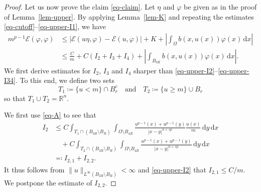 \documentclass[11pt]{amsart}
\theoremstyle{plain}
\theoremstyle{definition}
\numberwithin{equation}{section}
\begin{document}
\begin{proof}
Let us now prove the claim \eqref{eq-claim}. Let $\eta$ and $\varphi$ be given as in the proof of Lemma~\ref{lem-upper}. By applying Lemma~\ref{lem-K} and repeating the estimates \eqref{eq-cutoff}--\eqref{eq-upper-I1}, we have
\begin{equation}\label{eq-pos-E}
\begin{aligned}
    m^{p-1} \mathcal{E}(\varphi, \varphi) &\leq |\mathcal{E}(u\eta, \varphi)-\mathcal{E}(u, \varphi)|+K+\left|\int_{\Omega} b(x, u(x))\varphi(x) \,\mathrm{d}x \right|\\
    &\leq \frac{C}{m} + C( I_2+I_3+I_4)+\left|\int_{B_{3R}} b(x, u(x))\varphi(x) \,\mathrm{d}x \right|.
\end{aligned}
\end{equation}
We first derive estimates for $I_2$, $I_3$ and $I_4$ sharper than \eqref{eq-upper-I2}--\eqref{eq-upper-I34}.
To this end, we define two sets
	\begin{equation*}
		T_1 \coloneqq \{u <m\} \cap B_r^c \quad \text{and} \quad T_2 \coloneqq \{u \geq m\} \cup B_r
	\end{equation*}
	so that $T_1 \cup T_2 = \mathbb{R}^n$.

We first use \eqref{eq-A} to see that
	\begin{equation*}
		\begin{aligned}
			I_2
			&\leq C\int_{T_1 \cap (B_{3R} \setminus B_R)} \int_{\Omega \setminus B_{4R}} \frac{u^{p-1}(x)+u^{p-1}(y)}{|x-y|^{n+sp}} \frac{u(x)}{m} \,\mathrm{d}y\,\mathrm{d}x\\
			&\quad+C\int_{T_2 \cap (B_{3R} \setminus B_R)} \int_{\Omega \setminus B_{4R}} \frac{u^{p-1}(x)+u^{p-1}(y)}{|x-y|^{n+sp}}  \,\mathrm{d}y\,\mathrm{d}x\\
			&\eqqcolon I_{2, 1}+I_{2, 2}.
		\end{aligned}
	\end{equation*}
It thus follows from $\|u\|_{L^\infty(B_{3R} \setminus B_R)} < \infty$ and \eqref{eq-upper-I2} that $I_{2,1} \leq C/m$. We postpone the estimate of $I_{2,2}$.


\end{proof}
\end{document}
